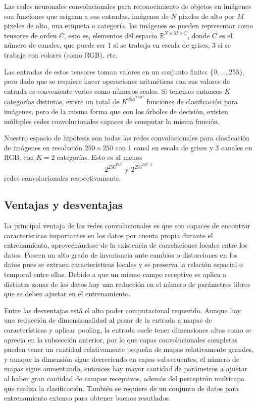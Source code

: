 \documentclass[spanish,11pt,letterpaper]{article}
\begin{document}
Las redes neuronales convolucionales para reconocimiento de objetos en imágenes
son funciones que asignan a sus entradas, imágenes de $N$ pixeles de alto por $M$
pixeles de alto, una etiqueta o categoría, las imágenes se pueden representar
como tensores de orden $C$, esto es, elementos del espacio
$\mathbb{R}^{N\times M\times C}$, donde $C$ es el número de canales, que puede ser
1 si se trabaja en escala de grises, 3 si se trabaja con colores (como RGB), etc.

Las entradas de estos tensores toman valores en un conjunto finito: $\{0,\ldots,255\}$,
pero dado que se requiere hacer operaciones aritméticas con sus valores de entrada
es conveniente verlos como números reales. Si tenemos entonces $K$ categorías
distintas, existe un total de $K^{256^{NMC}}$ funciones de clasificación para
imágenes, pero de la misma forma que con los árboles de decisión, existen múltiples
redes convolucionales capaces de computar la misma función.

Nuestro espacio de hipótesis son todas las redes convolucionales para clasficación
de imágenes en resolución $250 \times 250$ con 1 canal en escala de grises y 3
canales en RGB, con $K = 2$ categorías. Esto es al menos
\[ 2^{256^{250^2}} \text{  y  } 2^{256^{250^2 \cdot 3}}\]
redes convolucionales respectivamente.

\subsection{Ventajas y desventajas}

La principal ventaja de las redes convolucionales es que son capaces de encontrar
características importantes en los datos por cuenta propia durante el entrenamiento,
aprovechándose de la existencia de correlaciones locales entre los datos. Poseen
un alto grado de invariancia ante cambios o distorciones en los datos pues
se extraen características locales y se preserva la relación espacial o temporal
entre ellas. Debido a que un mismo campo receptivo se aplica a distintas zonas de
los datos hay una reducción en el número de parámetros libres que se
deben ajustar en el entrenamiento\cite{haykin}.

Entre las desventajas está el alto poder computacional requerido. Aunque hay una
reducción de dimensionalidad al pasar de la entrada a mapas de características y
aplicar pooling, la entrada suele tener dimensiones altas como se aprecia en la subsección
anterior, por lo que capas convolucionales completas pueden tener un cantidad
relativamente pequeña de mapas relativamente grandes, y aunque la dimensión sigue
decreciendo en capas subsecuentes, el número de mapas sigue aumentando, entonces
hay mayor cantidad de parámetros a ajustar al haber gran cantidad de campos receptivos,
además del perceptrón multicapa que realiza la clasificación. También se requiere
de un conjunto de datos para entrenamiento extenso para obtener buenos resutlados.
\end{document}
